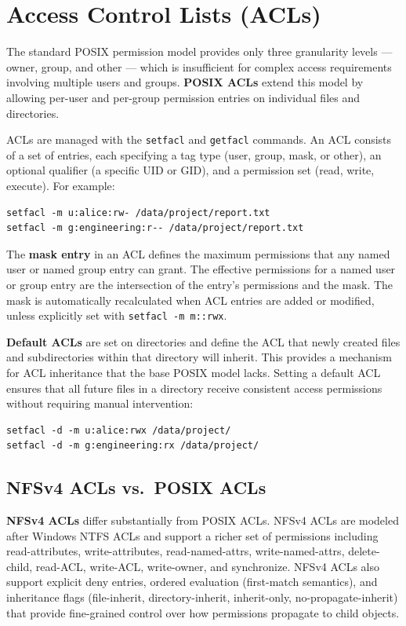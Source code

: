 \section{Access Control Lists (ACLs)}

The standard POSIX permission model provides only three granularity levels --- owner, group, and other --- which is insufficient for complex access requirements involving multiple users and groups. \textbf{POSIX ACLs} extend this model by allowing per-user and per-group permission entries on individual files and directories.

ACLs are managed with the \texttt{setfacl} and \texttt{getfacl} commands. An ACL consists of a set of entries, each specifying a tag type (user, group, mask, or other), an optional qualifier (a specific UID or GID), and a permission set (read, write, execute). For example:

\begin{verbatim}
setfacl -m u:alice:rw- /data/project/report.txt
setfacl -m g:engineering:r-- /data/project/report.txt
\end{verbatim}

The \textbf{mask entry} in an ACL defines the maximum permissions that any named user or named group entry can grant. The effective permissions for a named user or group entry are the intersection of the entry's permissions and the mask. The mask is automatically recalculated when ACL entries are added or modified, unless explicitly set with \texttt{setfacl -m m::rwx}.

\textbf{Default ACLs} are set on directories and define the ACL that newly created files and subdirectories within that directory will inherit. This provides a mechanism for ACL inheritance that the base POSIX model lacks. Setting a default ACL ensures that all future files in a directory receive consistent access permissions without requiring manual intervention:

\begin{verbatim}
setfacl -d -m u:alice:rwx /data/project/
setfacl -d -m g:engineering:rx /data/project/
\end{verbatim}

\subsection{NFSv4 ACLs vs.\ POSIX ACLs}

\textbf{NFSv4 ACLs} differ substantially from POSIX ACLs. NFSv4 ACLs are modeled after Windows NTFS ACLs and support a richer set of permissions including read-attributes, write-attributes, read-named-attrs, write-named-attrs, delete-child, read-ACL, write-ACL, write-owner, and synchronize. NFSv4 ACLs also support explicit deny entries, ordered evaluation (first-match semantics), and inheritance flags (file-inherit, directory-inherit, inherit-only, no-propagate-inherit) that provide fine-grained control over how permissions propagate to child objects.

